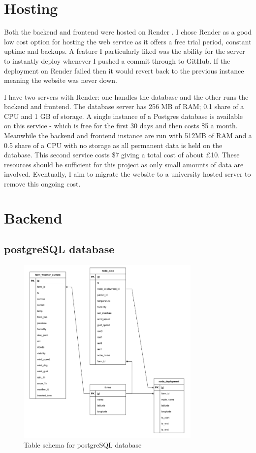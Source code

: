 \section{Hosting}\label{sec:hosting-webapp}

Both the backend and frontend were hosted on Render \cite{render}. I chose
Render as a good low cost option for hosting the web service as it offers a free
trial period, constant uptime and backups. A feature I particularly liked was
the ability for the server to instantly deploy whenever I pushed a commit
through to GitHub. If the deployment on Render failed then it would revert back
to the previous instance meaning the website was never down.

I have two servers with Render: one handles the database and the other runs the
backend and frontend. The database server has 256 MB of RAM; 0.1 share of a CPU
and 1 GB of storage. A single instance of a Postgres database is available on
this service - which is free for the first 30 days and then costs \$5 a month.
Meanwhile the backend and frontend instance are run with 512MB of RAM and a 0.5
share of a CPU with no storage as all permanent data is held on the database.
This second service costs \$7 giving a total cost of about £10. These resources
should be sufficient for this project as only small amounts of data are
involved. Eventually, I aim to migrate the website to a university hosted server
to remove this ongoing cost.

\section{Backend}\label{sec:backend-all}

\subsection{postgreSQL database}\label{sec:database}

\begin{figure}[H]
    \centering
    \includegraphics[width=0.8\textwidth]{contents/part-3/fig3/postgres_diagram.png}
    \caption{Table schema for postgreSQL database}
    \label{fig:db_schema}
\end{figure}

